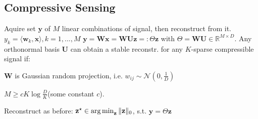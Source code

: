 \subsection*{Compressive Sensing}
Aquire set $\mathbf{y}$ of $M$ linear combinations of signal, then reconstruct from it. $y_k = \langle \mathbf{w}_k, \mathbf{x} \rangle, k=1,...,M $
$\mathbf{y}=\mathbf{Wx}=\mathbf{WUz} =: \Theta\mathbf{z}$ with $\Theta = \mathbf{WU} \in \mathbb{R}^{M\times D}$.
Any orthonormal basis $\mathbf{U}$ can obtain a stable reconstr. for any $K$-sparse compressible signal if: \begin{inparaitem}[\color{gray}\textbullet]
\item $\mathbf{W}$ is Gaussian random projection, i.e. $w_{ij}\sim \mathcal{N}(0,\frac{1}{D})$
\item $M\geq cK \log \frac{D}{K}$(some constant $c$).
\end{inparaitem}
Reconstruct as before: $\mathbf{z}^\star \in \operatorname*{arg\,min}_{\mathbf{z}}\|\mathbf{z}\|_0$, s.t. $\mathbf{y} = \Theta\mathbf{z}$ 